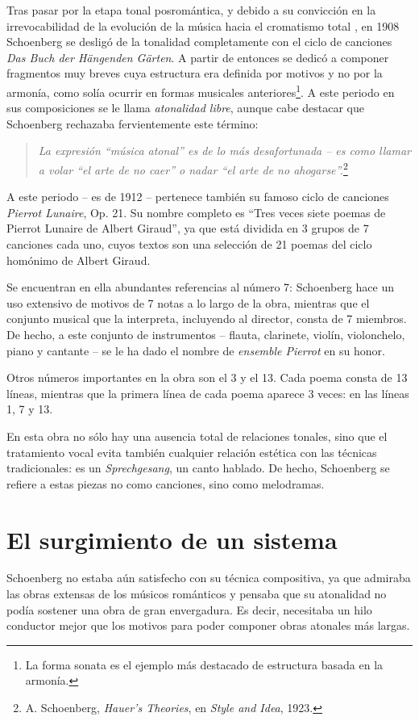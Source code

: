 		Tras pasar por la etapa tonal posromántica, y debido a su convicción en la irrevocabilidad de la evolución de la música hacia el cromatismo total \cite{delgado}, en 1908 Schoenberg se desligó de la tonalidad completamente con el ciclo de canciones \emph{Das Buch der Hängenden Gärten}. A partir de entonces se dedicó a componer fragmentos muy breves cuya estructura era definida por motivos y no por la armonía, como solía ocurrir en formas musicales anteriores\footnote{La forma sonata es el ejemplo más destacado de estructura basada en la armonía.}. A este periodo en sus composiciones se le llama \emph{atonalidad libre}, aunque cabe destacar que Schoenberg rechazaba fervientemente este término:
		
		\begin{quote}
			\emph{La expresión “música atonal” es de lo más desafortunada -- es como llamar a volar “el arte de no caer” o nadar “el arte de no ahogarse”.}\footnote{A. Schoenberg, \emph{Hauer's Theories}, en \emph{Style and Idea}, 1923.}
		\end{quote}
				
		A este periodo -- es de 1912 -- pertenece también su famoso ciclo de canciones \emph{Pierrot Lunaire}, Op. 21. Su nombre completo es ``Tres veces siete poemas de Pierrot Lunaire de Albert Giraud'', ya que está dividida en 3 grupos de 7 canciones cada uno, cuyos textos son una selección de 21 poemas del ciclo homónimo de Albert Giraud. 
		
		Se encuentran en ella abundantes referencias al número 7: Schoenberg hace un uso extensivo de motivos de 7 notas a lo largo de la obra, mientras que el conjunto musical que la interpreta, incluyendo al director, consta de 7 miembros. De hecho, a este conjunto de instrumentos -- flauta, clarinete, violín, violonchelo, piano y cantante -- se le ha dado el nombre de \textit{ensemble Pierrot} en su honor. 
		
		Otros números importantes en la obra son el 3 y el 13. Cada poema consta de 13 líneas, mientras que la primera línea de cada poema aparece 3 veces: en las líneas 1, 7 y 13.
		
		En esta obra no sólo hay una ausencia total de relaciones tonales, sino que el tratamiento vocal evita también cualquier relación estética con las técnicas tradicionales: es un \emph{Sprechgesang}, un canto hablado. De hecho, Schoenberg se refiere a estas piezas no como canciones, sino como melodramas. \cite{diaz}
		
	\section{El surgimiento de un sistema}
		Schoenberg no estaba aún satisfecho con su técnica compositiva, ya que admiraba las obras extensas de los músicos románticos y pensaba que su atonalidad no podía sostener una obra de gran envergadura. Es decir, necesitaba un hilo conductor mejor que los motivos para poder componer obras atonales más largas.
		
